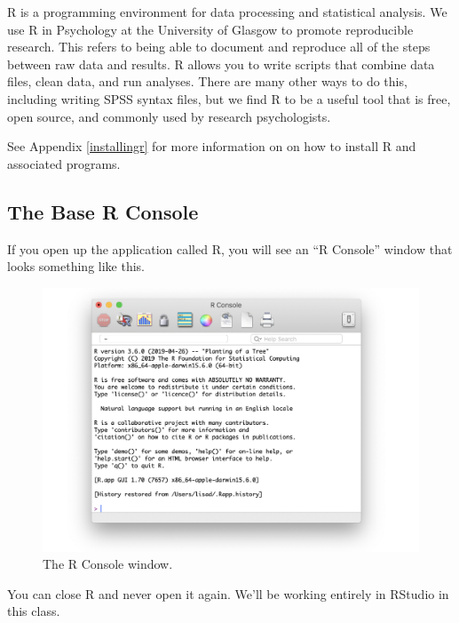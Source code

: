 \documentclass[
  oneside]{book}
\begin{document}
R is a programming environment for data processing and statistical analysis. We use R in Psychology at the University of Glasgow to promote reproducible research. This refers to being able to document and reproduce all of the steps between raw data and results. R allows you to write scripts that combine data files, clean data, and run analyses. There are many other ways to do this, including writing SPSS syntax files, but we find R to be a useful tool that is free, open source, and commonly used by research psychologists.

\begin{info}
See Appendix \ref{installingr} for more information on on how to install R and associated programs.

\end{info}

\hypertarget{rconsole}{%
\subsection{The Base R Console}\label{rconsole}}

If you open up the application called R, you will see an ``R Console'' window that looks something like this.

\begin{figure}

{\centering \includegraphics[width=1\linewidth]{images/01/r_console} 

}

\caption{The R Console window.}\label{fig:img-repl}
\end{figure}

You can close R and never open it again. We'll be working entirely in RStudio in this class.
\end{document}
